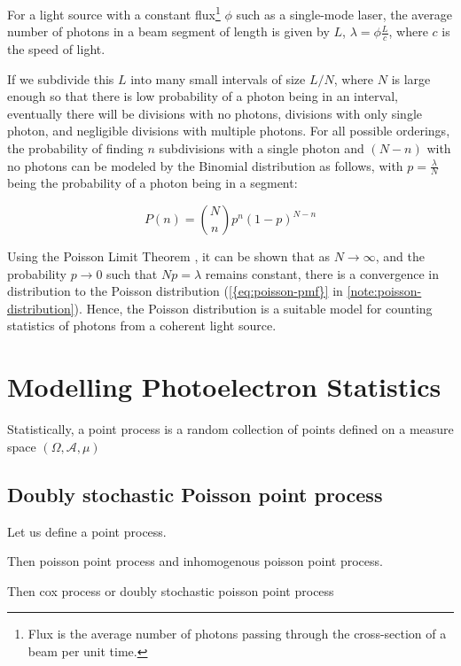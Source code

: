 For a light source with a constant flux\footnote{Flux is the average number of photons passing through the cross-section of a beam per unit time.} $\phi$ such as a single-mode laser, the average number of photons in a beam segment of length is given by $L$, $\lambda = \phi \frac{L}{c}$, where $c$ is the speed of light.

If we subdivide this $L$ into many small intervals  of size $L/N$, where $N$ is large enough so that there is low probability of a photon being in an interval, eventually there will be divisions with no photons, divisions with only single photon, and negligible divisions with multiple photons. For all possible orderings, the probability of finding $n$ subdivisions with a single photon and $(N-n)$ with no photons can be modeled by the Binomial distribution as follows, with $p=\frac{\lambda}{N}$ being the probability of a photon being in a segment:

\begin{equation}
    P(n) = \binom{N}{n} p^n (1 - p)^{N - n}
\end{equation}

Using the Poisson Limit Theorem \cite{fellerIntroductionProbabilityTheory1968}, it can be shown that as $N \to \infty$, and the probability $p \to 0$ such that $Np = \lambda$ remains constant, there is a convergence in distribution to the Poisson distribution (\cref{{eq:poisson-pmf}} in \cref{note:poisson-distribution}). Hence, the Poisson distribution is a suitable model for counting statistics of photons from a coherent light source.

\section{Modelling Photoelectron Statistics}\label{section:photoelectron-counting-stats}
Statistically, a point process is a random collection of points defined on a measure space $(\Omega, \mathcal{A}, \mu)$

\subsection{Doubly stochastic Poisson point process}
Let us define a point process. 

Then poisson point process and inhomogenous poisson point process.

Then cox process or doubly stochastic poisson point process

